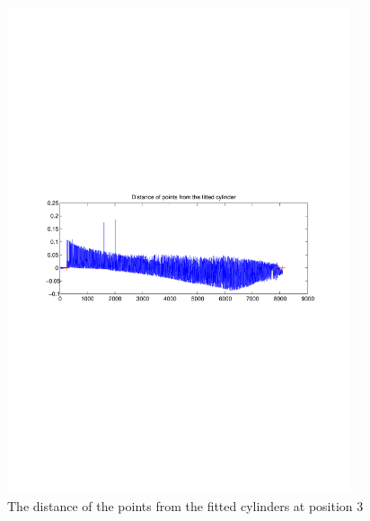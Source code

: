 \begin{figure}[htbp]
    \centering
    \includegraphics[width=0.9\textwidth]{pics/pos21-control-tof-dist}
    \caption{The distance of the points from the fitted cylinders at position 3}
    \label{chap7:fig-pos21-control-tof-dits}
\end{figure}
